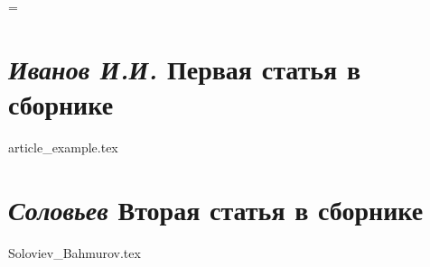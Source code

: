 \documentclass[openany, twoside, a4paper, 10pt]{extbook}
\makeatletter
\newcommand{\unchapter}[1]{%
    \begingroup
    \let\@makechapterhead\@gobble %
    \chapter{#1}
    \endgroup
}
\newcommand{\AddRefPrefix}[1]{
    \renewcommand{\Pageref}[1]{\pageref{#1##1}}
    \renewcommand{\Refn}[1]{\ref{#1##1}}
    \renewcommand{\Label}[1]{\label{#1##1}}
}
\newcommand{\Refn}[1]{\ref{#1}}
\newcommand{\Pageref}[1]{\pageref{#1}}
\newcommand{\Label}[1]{\label{#1}}
\makeatother
\begin{document}
    \renewcommand{\thelstlisting}{\arabic{lstlisting}}

	\setcounter{page}{3}
	\setcounter{tocdepth}{0}
	\tableofcontents
    \justifying
    \emergencystretch=\maxdimen

    \unchapter{\textnormal{\textit{Иванов И.И.}} Первая статья в сборнике}
    \AddRefPrefix{th1}
    {article_example.tex}
    \unchapter{\textnormal{\textit{Соловьев}} Вторая статья в сборнике}
    \AddRefPrefix{th2}
    {Soloviev_Bahmurov.tex}
\end{document}
